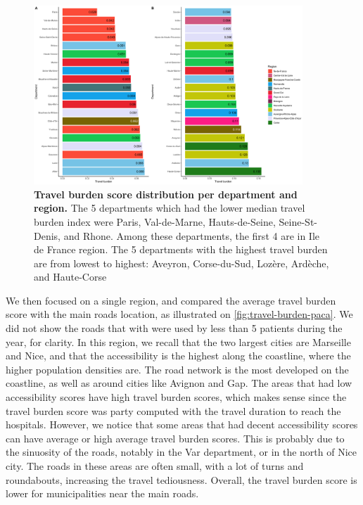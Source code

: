 \begin{figure}[h!]
    \includegraphics[width=0.9\textwidth]{images/routes/sup_fig_2.png}
    \centering
    \caption{
        \textbf{Travel burden score distribution per department and region.}
        The 5 departments which had the lower median travel burden index were
        Paris, Val-de-Marne, Hauts-de-Seine, Seine-St-Denis, and Rhone. Among these
        departments, the first 4 are in Ile de France region. The 5 departments with the
        highest travel burden are from lowest to highest: Aveyron, Corse-du-Sud, Lozère,
        Ardèche, and Haute-Corse}
    \label{fig:routes-burden-departments-top-bottom-20}
\end{figure}

We then focused on a single region, and compared the average travel burden score
with the main roads location, as illustrated on \cref{fig:travel-burden-paca}.
We did not show the roads that with were used by less than 5 patients during the
year, for clarity. In this region, we recall that the two largest cities are
Marseille and Nice, and that the accessibility is the highest along the
coastline, where the higher population densities are. The road network is the
most developed on the coastline, as well as around cities like Avignon and Gap.
The areas that had low accessibility scores have high travel burden scores,
which makes sense since the travel burden score was party computed with the
travel duration to reach the hospitals. However, we notice that some areas that
had decent accessibility scores can have average or high average travel burden
scores. This is probably due to the sinuosity of the roads, notably in the Var
department, or in the north of Nice city. The roads in these areas are often
small, with a lot of turns and roundabouts, increasing the travel tediousness.
Overall, the travel burden score is lower for municipalities near the main
roads.

